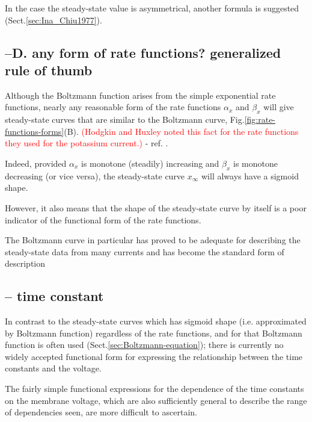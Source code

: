 In the case the steady-state value is asymmetrical, another formula is suggested
(Sect.\ref{sec:Ina_Chiu1977}).



\subsection{--D. any form of rate functions? generalized rule of thumb}
\label{sec:steady-state-curve-using-rate-function-any-form}

Although the Boltzmann function arises from the simple exponential rate
functions, nearly any reasonable form of the rate functions $\alpha_x$ and
$\beta_x$ will give steady-state curves that are similar to the Boltzmann curve,
Fig.\ref{fig:rate-functions-forms}(B). \textcolor{red}{(Hodgkin and Huxley noted
this fact for the rate functions they used for the potassium current.)} - ref.
\citep{willms1999}.

Indeed, provided $\alpha_x$ is monotone (steadily) increasing and $\beta_x$ is
monotone decreasing (or vice versa), the steady-state curve $x_\infty$ will
always have a sigmoid shape.

However, it also means that the shape of the steady-state curve by itself is a
poor indicator of the functional form of the rate functions.

The Boltzmann curve in particular has proved to be adequate for describing the
steady-state data from many currents and has become the standard form of
description



\subsection{-- time constant}
\label{sec:gate-kinetics-using-time-constant}

In contrast to the steady-state curves which has sigmoid shape (i.e.
approximated by Boltzmann function) regardless of the rate functions, and for
that Boltzmann function is often used (Sect.\ref{sec:Boltzmann-equation}); there
is currently no widely accepted functional form for expressing the relationship
between the time constants and the voltage.

The fairly simple functional expressions for the dependence of the time
constants on the membrane voltage, which are also sufficiently general to
describe the range of dependencies seen, are more difficult to ascertain.


